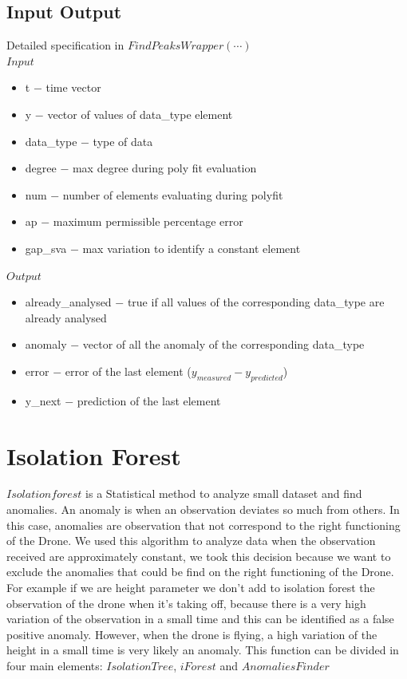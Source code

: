 \documentclass[journal]{IEEEtran}
\begin{document}
\subsection{Input \- Output}
Detailed specification in \(FindPeaksWrapper(\cdots)\)
\\
\(Input\)
\begin{itemize}
\item t \(-\) time vector 
\item y \(-\) vector of values of data\_type element
\item data\_type \(-\) type of data
\item degree \(-\) max degree during poly fit evaluation
\item num \(-\) number of elements evaluating during polyfit
\item ap \(-\) maximum permissible percentage error
\item gap\_sva \(-\) max variation to identify a constant element
\end{itemize}

\(Output\)
\begin{itemize}
\item already\_analysed \(-\) true if all values of the corresponding data\_type are already analysed
\item anomaly \(-\) vector of all the anomaly of the corresponding data\_type
\item error \(-\) error of the last element (\(y_{measured}-y_{predicted}\))
\item y\_next \(-\) prediction of the last element
\end{itemize}


\section{Isolation Forest}
\(Isolation forest\) is a Statistical method to analyze small dataset and find anomalies. An anomaly is when an observation deviates so much from others.  In this case, anomalies are observation that not correspond to the right functioning of the Drone. We used this algorithm to analyze data when the observation received are approximately constant, we took this decision because we want to exclude the anomalies that could be find on the right functioning of the Drone. For example if we are height parameter we don’t add to isolation forest the observation of the drone when it’s  taking off, because there is a very high variation of the observation in a small time and this can be identified as a false positive anomaly. However, when the drone is flying, a high variation of the height in a small time is very likely an anomaly. 
This function can be divided in four main elements: \(Isolation Tree\), \(iForest\) and \(Anomalies Finder\)
\end{document}
